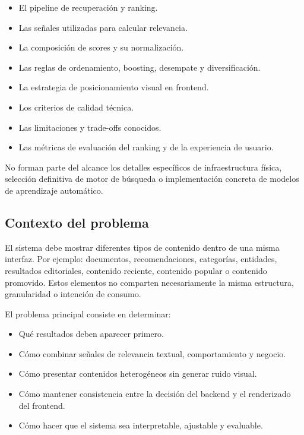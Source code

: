 \documentclass[12pt,a4paper]{article}
\begin{document}
\begin{itemize}[noitemsep]
    \item El pipeline de recuperación y ranking.
    \item Las señales utilizadas para calcular relevancia.
    \item La composición de scores y su normalización.
    \item Las reglas de ordenamiento, boosting, desempate y diversificación.
    \item La estrategia de posicionamiento visual en frontend.
    \item Los criterios de calidad técnica.
    \item Las limitaciones y trade-offs conocidos.
    \item Las métricas de evaluación del ranking y de la experiencia de usuario.
\end{itemize}

No forman parte del alcance los detalles específicos de infraestructura física, selección definitiva de motor de búsqueda o implementación concreta de modelos de aprendizaje automático.

\subsection{Contexto del problema}

El sistema debe mostrar diferentes tipos de contenido dentro de una misma interfaz. Por ejemplo: documentos, recomendaciones, categorías, entidades, resultados editoriales, contenido reciente, contenido popular o contenido promovido. Estos elementos no comparten necesariamente la misma estructura, granularidad o intención de consumo.

El problema principal consiste en determinar:

\begin{itemize}[noitemsep]
    \item Qué resultados deben aparecer primero.
    \item Cómo combinar señales de relevancia textual, comportamiento y negocio.
    \item Cómo presentar contenidos heterogéneos sin generar ruido visual.
    \item Cómo mantener consistencia entre la decisión del backend y el renderizado del frontend.
    \item Cómo hacer que el sistema sea interpretable, ajustable y evaluable.
\end{itemize}
\end{document}
